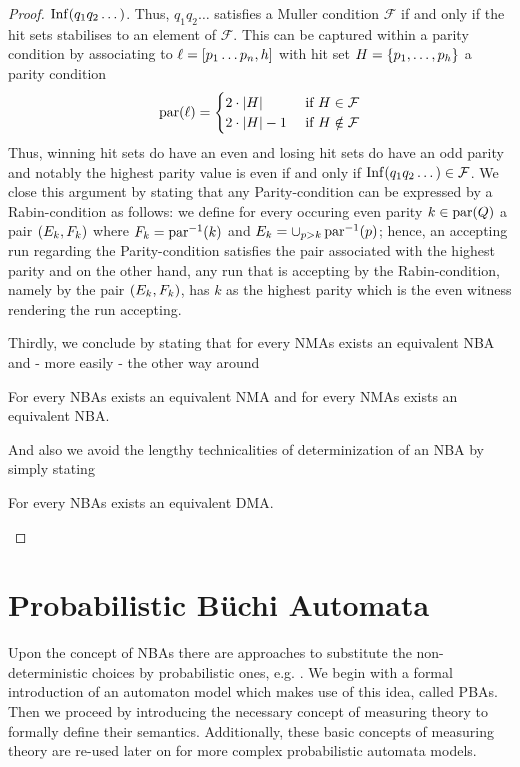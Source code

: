 \begin{proof}
  $\operatorname{Inf}(q_{1}q_{2}\dots)$. Thus, $q_{1}q_{2}\dots$ satisfies a Muller condition
  $\mathcal{F}$ if and only if the hit sets stabilises to an element of
  $\mathcal{F}$. This can be captured within a parity condition by associating
  to $\ell = \left[p_{1}\dots p_{n},h\right]$ with hit set
  $H = \left\{p_{1},\dots,p_{h}\right\}$ a parity condition
  \begin{equation*}
    \operatorname{par}(\ell) = \begin{cases}
      2\cdot\left\vert{H}\right\vert &\text{ if }H\in\mathcal{F}\\
      2\cdot\left\vert{H}\right\vert-1 &\text{ if }H\notin\mathcal{F}
    \end{cases}
  \end{equation*}
  Thus, winning hit sets do have an even and losing hit sets do have an odd
  parity and notably the highest parity value is even if and only if
  $\operatorname{Inf}(q_{1}q_{2}\dots)\in\mathcal{F}$. We close this argument by stating that
  any Parity-condition can be expressed by a Rabin-condition as follows:
  we define for every occuring even parity $k\in\operatorname{par}(Q)$ a pair
  $\left(E_{k}, F_{k}\right)$ where $F_{k} = \operatorname{par}^{-1}(k)$ and
  $E_{k} = \cup_{p>k}\operatorname{par}^{-1}(p)$; hence, an accepting run regarding the
  Parity-condition satisfies the pair associated with the highest parity and
  on the other hand, any run that is accepting by the Rabin-condition, namely
  by the pair $\left(E_{k}, F_{k}\right)$, has  $k$ as the highest parity which is
  the even witness rendering the run accepting.

  Thirdly, we conclude by stating that for every \acp{NMA} exists an equivalent
  \ac{NBA} and - more easily - the other way around
  \begin{theorem}
    \cite[Theorem 1.10]{AutoLogInfGames}
    For every \acp{NBA} exists an equivalent \ac{NMA} and for every \acp{NMA}
    exists an equivalent \ac{NBA}.
  \end{theorem}
  And also we avoid the lengthy technicalities of determinization of an
 \ac{NBA} by simply stating
  \begin{theorem}
    \cite[Theorem 3.6]{AutoLogInfGames}
    For every \acp{NBA} exists an equivalent \ac{DMA}.
  \end{theorem}
\end{proof}

\section{Probabilistic Büchi Automata}
Upon the concept of \acp{NBA} there are approaches to substitute the
non-deterministic choices by probabilistic ones, e.g.
\cite{RecOmeLangProbAuto,DecProblemsForProbAuto,Groesser}. We begin with
a formal introduction of an automaton model which makes use of this idea,
called \aclp{PBA}. Then we proceed by introducing the necessary concept of
measuring theory to formally define their semantics. Additionally, these basic
concepts of measuring theory are re-used later on for more complex
probabilistic automata models.


